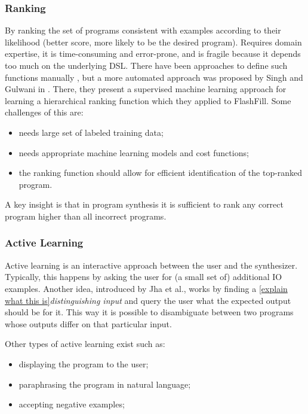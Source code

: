 \subsubsection{Ranking}

 By ranking the set of programs consistent with
examples according to their likelihood (better score, more likely to be the
desired program). Requires domain expertise, it is time-consuming and
error-prone, and is fragile because it depends too much on the underlying
\ac{DSL}. There have been approaches to define such functions manually
, but a more automated approach was
proposed by Singh and Gulwani in \cite{Singh:ranking:2015}. There, they present
a supervised machine learning approach for learning a  hierarchical ranking function which
they applied to  FlashFill. Some
challenges of this are:
\begin{itemize}
\item needs large set of labeled training data;
\item needs appropriate machine learning models and cost functions;
\item the ranking function should allow for efficient identification of the
  top-ranked program.
\end{itemize}

 A key insight is that in program synthesis it is sufficient
to rank any correct program higher than all incorrect programs.

\subsubsection{Active Learning}

Active learning is an interactive approach between the user and the synthesizer.
Typically, this happens by asking the user for (a small set of) additional
\ac{IO} examples. Another idea,  introduced by Jha et
al.\cite{Jha:oracle:2010}, works by finding a \ref{explain what this
is}\textit{distinguishing input} and query the user what the expected output
should be for it. This way it is possible to disambiguate between two programs
whose outputs differ on that particular input.

Other types of active learning exist such as:
\begin{itemize}
\item displaying the program to the user;
\item paraphrasing the program in natural language;
\item accepting negative examples; 
\end{itemize}

